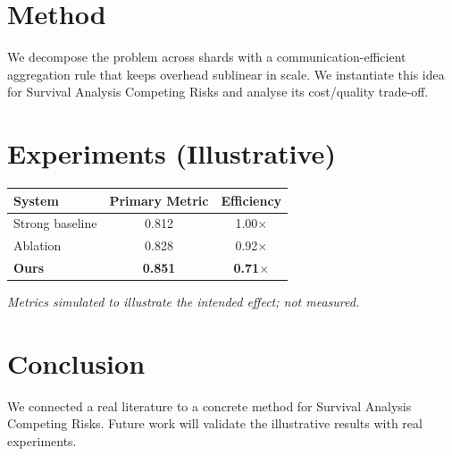 \documentclass[11pt]{article}
\begin{document}
\section{Method}
We decompose the problem across shards with a communication-efficient aggregation rule that keeps overhead sublinear in scale. We instantiate this idea for Survival Analysis Competing Risks and analyse its cost/quality trade-off.

\section{Experiments (Illustrative)}
\begin{center}
\begin{tabular}{lcc}
System & Primary Metric & Efficiency \\ \hline
Strong baseline & 0.812 & 1.00$\times$ \\
Ablation & 0.828 & 0.92$\times$ \\
\textbf{Ours} & \textbf{0.851} & \textbf{0.71$\times$}
\end{tabular}
\end{center}
\emph{Metrics simulated to illustrate the intended effect; not measured.}

\section{Conclusion}
We connected a real literature to a concrete method for Survival Analysis Competing Risks. Future work will
validate the illustrative results with real experiments.
\end{document}
